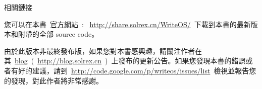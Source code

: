 \vspace{5ex}

\begin{lined}{\textwidth}\vspace{2ex}
\begin{center}
相關鏈接
\end{center}
\vspace{2ex}
\end{lined}

您可以在本書~\href{http://share.solrex.cn/WriteOS/}{官方網站}~: ~\url{http://share.solrex.cn/WriteOS/}~下載到本書的最新版本和附帶的全部 source code。

由於此版本非最終發布版，如果您對本書感興趣，請關注作者在其~\href{http://blog.solrex.cn/articles/category/cs/opensource/writeos}{blog}~(~\url{http://blog.solrex.cn}~)~上發布的更新公告。如果您發現本書的錯誤或者有好的建議，請到~\url{http://code.google.com/p/writeos/issues/list}~檢視並報告您的發現，對此作者將非常感謝。

